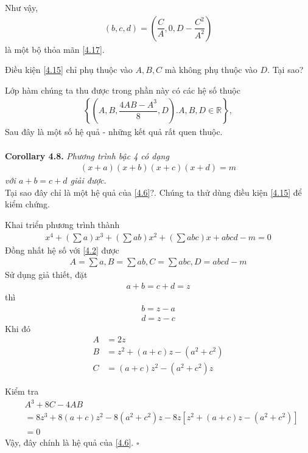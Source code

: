 \documentclass[a4paper,oneside]{book}
\numberwithin{equation}{chapter}
\begin{document}
Như vậy, 
\begin{align}
\left( {b,c,d} \right) = \left( {\dfrac{C}{A},0,D - \dfrac{{{C^2}}}{{{A^2}}}} \right)
\end{align}
là một bộ thỏa mãn \eqref{4.17}.

Điều kiện \eqref{4.15} chỉ phụ thuộc vào $A,B,C$ mà không phụ thuộc vào $D$. Tại sao?

Lớp hàm chúng ta thu được trong phần này có các hệ số thuộc 
\begin{align}
\left\{ {\left( {A,B,\dfrac{{4AB - {A^3}}}{8},D} \right).A,B,D \in \mathbb{R}} \right\},
\end{align}
Sau đây là một số hệ quả - những kết quả rất quen thuộc.\\
\\
\textbf{Corollary 4.8.} \textit{Phương trình bậc 4 có dạng 
\begin{align}
\left( {x + a} \right)\left( {x + b} \right)\left( {x + c} \right)\left( {x + d} \right) = m
\end{align}
với $a + b = c + d$ giải được.}\\

Tại sao đây chỉ là một hệ quả của \eqref{4.6}?. Chúng ta thử dùng điều kiện \eqref{4.15} để kiểm chứng.

Khai triển phương trình thành 
\begin{align}
{x^4} + \left( {\sum a } \right){x^3} + \left( {\sum {ab} } \right){x^2} + \left( {\sum {abc} } \right)x + abcd - m = 0
\end{align}
Đồng nhất hệ số với \eqref{4.2} được 
\begin{align}
A = \sum a ,B = \sum {ab} ,C = \sum {abc} ,D = abcd - m
\end{align}
Sử dụng giả thiết, đặt 
\begin{align}
a + b = c + d = z
\end{align}
thì 
\begin{align}
b = z - a\\
d = z - c
\end{align}
Khi đó
\begin{align}
A &= 2z\\
B &= {z^2} + \left( {a + c} \right)z - \left( {{a^2} + {c^2}} \right)\\
C &= \left( {a + c} \right){z^2} - \left( {{a^2} + {c^2}} \right)z
\end{align}

Kiểm tra
\begin{align}
& {A^3} + 8C - 4AB \\
& = 8{z^3} + 8\left( {a + c} \right){z^2} - 8\left( {{a^2} + {c^2}} \right)z - 8z\left[ {{z^2} + \left( {a + c} \right)z - \left( {{a^2} + {c^2}} \right)} \right] \\
& = 0
\end{align}
Vậy, đây chính là hệ quả của \eqref{4.6}. \hfill $\square$\\
\end{document}
